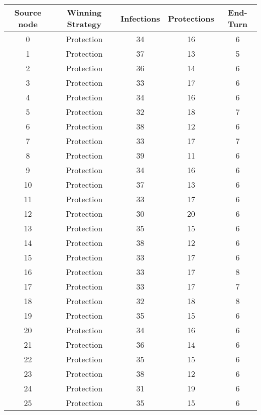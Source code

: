 \documentclass[results.tex]{subfiles}
\begin{document}
\begin{center}
  \begin{tabular}{| c || c | c | c | c |}
    \hline
    {\bfseries Source node} & {\bfseries Winning Strategy} & {\bfseries Infections} & {\bfseries Protections} & {\bfseries End-Turn} \\  %
    \hline\hline
    0 & Protection & 34 & 16 & 6 \\ 
    \hline
    1 & Protection & 37 & 13 & 5 \\ 
    \hline
    2 & Protection & 36 & 14 & 6 \\ 
    \hline
    3 & Protection & 33 & 17 & 6 \\ 
    \hline
    4 & Protection & 34 & 16 & 6 \\ 
    \hline
    5 & Protection & 32 & 18 & 7 \\ 
    \hline
    6 & Protection & 38 & 12 & 6 \\ 
    \hline
    7 & Protection & 33 & 17 & 7 \\ 
    \hline
    8 & Protection & 39 & 11 & 6 \\ 
    \hline
    9 & Protection & 34 & 16 & 6 \\ 
    \hline
    10 & Protection & 37 & 13 & 6 \\ 
    \hline
    11 & Protection & 33 & 17 & 6 \\ 
    \hline
    12 & Protection & 30 & 20 & 6 \\ 
    \hline
    13 & Protection & 35 & 15 & 6 \\ 
    \hline
    14 & Protection & 38 & 12 & 6 \\ 
    \hline
    15 & Protection & 33 & 17 & 6 \\ 
    \hline
    16 & Protection & 33 & 17 & 8 \\ 
    \hline
    17 & Protection & 33 & 17 & 7 \\ 
    \hline
    18 & Protection & 32 & 18 & 8 \\ 
    \hline
    19 & Protection & 35 & 15 & 6 \\ 
    \hline
    20 & Protection & 34 & 16 & 6 \\ 
    \hline
    21 & Protection & 36 & 14 & 6 \\ 
    \hline
    22 & Protection & 35 & 15 & 6 \\ 
    \hline
    23 & Protection & 38 & 12 & 6 \\ 
    \hline
    24 & Protection & 31 & 19 & 6 \\ 
    \hline
    25 & Protection & 35 & 15 & 6 \\ 

\end{tabular}
\end{center}
\end{document}
